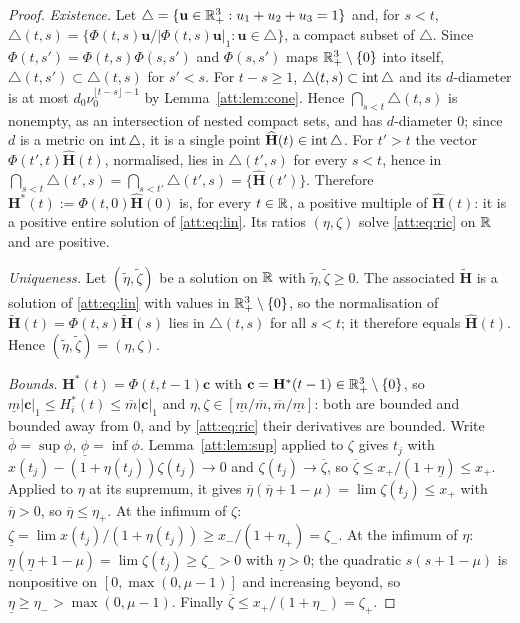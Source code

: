 \begin{proof}
\emph{Existence.} Let $\triangle=\{\mathbf u\in\mathbb R^3_+:u_1+u_2+u_3=1\}$ and, for $s<t$, $\triangle(t,s)=\{\Phi(t,s)\mathbf u/|\Phi(t,s)\mathbf u|_1:\mathbf u\in\triangle\}$, a compact subset of $\triangle$. Since $\Phi(t,s')=\Phi(t,s)\Phi(s,s')$ and $\Phi(s,s')$ maps $\mathbb R^3_+\setminus\{0\}$ into itself, $\triangle(t,s')\subset\triangle(t,s)$ for $s'<s$. For $t-s\ge1$, $\triangle(t,s)\subset\operatorname{int}\triangle$ and its $d$-diameter is at most $d_0\nu_0^{\lfloor t-s\rfloor-1}$ by Lemma~\ref{att:lem:cone}. Hence $\bigcap_{s<t}\triangle(t,s)$ is nonempty, as an intersection of nested compact sets, and has $d$-diameter $0$; since $d$ is a metric on $\operatorname{int}\triangle$, it is a single point $\widehat{\mathbf H}(t)\in\operatorname{int}\triangle$. For $t'>t$ the vector $\Phi(t',t)\widehat{\mathbf H}(t)$, normalised, lies in $\triangle(t',s)$ for every $s<t$, hence in $\bigcap_{s<t}\triangle(t',s)=\bigcap_{s<t'}\triangle(t',s)=\{\widehat{\mathbf H}(t')\}$. Therefore $\mathbf H^\ast(t):=\Phi(t,0)\widehat{\mathbf H}(0)$ is, for every $t\in\mathbb R$, a positive multiple of $\widehat{\mathbf H}(t)$: it is a positive entire solution of \eqref{att:eq:lin}. Its ratios $(\eta,\zeta)$ solve \eqref{att:eq:ric} on $\mathbb R$ and are positive.

\emph{Uniqueness.} Let $(\tilde\eta,\tilde\zeta)$ be a solution on $\mathbb R$ with $\tilde\eta,\tilde\zeta\ge0$. The associated $\widetilde{\mathbf H}$ is a solution of \eqref{att:eq:lin} with values in $\mathbb R^3_+\setminus\{0\}$, so the normalisation of $\widetilde{\mathbf H}(t)=\Phi(t,s)\widetilde{\mathbf H}(s)$ lies in $\triangle(t,s)$ for all $s<t$; it therefore equals $\widehat{\mathbf H}(t)$. Hence $(\tilde\eta,\tilde\zeta)=(\eta,\zeta)$.

\emph{Bounds.} $\mathbf H^\ast(t)=\Phi(t,t-1)\mathbf c$ with $\mathbf c=\mathbf H^\ast(t-1)\in\mathbb R^3_+\setminus\{0\}$, so $\underline m|\mathbf c|_1\le H^\ast_i(t)\le\overline m|\mathbf c|_1$ and $\eta,\zeta\in[\underline m/\overline m,\overline m/\underline m]$: both are bounded and bounded away from $0$, and by \eqref{att:eq:ric} their derivatives are bounded. Write $\overline\phi=\sup\phi$, $\underline\phi=\inf\phi$. Lemma~\ref{att:lem:sup} applied to $\zeta$ gives $t_j$ with $x(t_j)-(1+\eta(t_j))\zeta(t_j)\to0$ and $\zeta(t_j)\to\overline\zeta$, so $\overline\zeta\le x_+/(1+\underline\eta)\le x_+$. Applied to $\eta$ at its supremum, it gives $\overline\eta(\overline\eta+1-\mu)=\lim\zeta(t_j)\le x_+$ with $\overline\eta>0$, so $\overline\eta\le\eta_+$. At the infimum of $\zeta$: $\underline\zeta=\lim x(t_j)/(1+\eta(t_j))\ge x_-/(1+\eta_+)=\zeta_-$. At the infimum of $\eta$: $\underline\eta(\underline\eta+1-\mu)=\lim\zeta(t_j)\ge\zeta_->0$ with $\underline\eta>0$; the quadratic $s(s+1-\mu)$ is nonpositive on $[0,\max(0,\mu-1)]$ and increasing beyond, so $\underline\eta\ge\eta_->\max(0,\mu-1)$. Finally $\overline\zeta\le x_+/(1+\eta_-)=\zeta_+$.


\end{proof}
